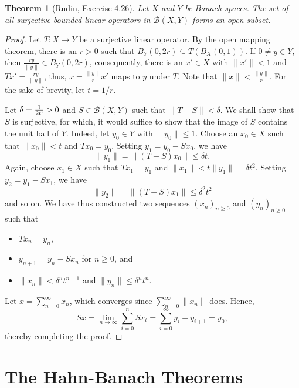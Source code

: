 \documentclass[12pt]{article}
\theoremstyle{thmstyle}
\newtheorem{theorem}{Theorem}[section]
\theoremstyle{defstyle}
\newcommand{\scrB}{\mathscr B}
\renewcommand{\le}{\leqslant}
\renewcommand{\ge}{\geqslant}
\begin{document}
\begin{theorem}[Rudin, Exercise 4.26]
    Let $X$ and $Y$ be Banach spaces. The set of all surjective bounded linear operators in $\scrB(X, Y)$ forms an open subset.
\end{theorem}
\begin{proof}
    Let $T: X\to Y$ be a surjective linear operator. By the open mapping theorem, there is an $r > 0$ such that $B_Y(0, 2r)\subseteq T\left(B_X(0, 1)\right)$. If $0\ne y\in Y$, then $\frac{ry}{\|y\|}\in B_Y(0, 2r)$, consequently, there is an $x'\in X$ with $\|x'\| < 1$ and $Tx' = \frac{ry}{\|y\|}$, thus, $x = \frac{\|y\|}{r}x'$ maps to $y$ under $T$. Note that $\|x\| < \frac{\|y\|}{r}$. For the sake of brevity, let $t = 1/r$.

    Let $\delta = \frac{1}{2t`} > 0$ and $S\in\scrB(X, Y)$ such that $\|T - S\| < \delta$. We shall show that $S$ is surjective, for which, it would suffice to show that the image of $S$ contains the unit ball of $Y$. Indeed, let $y_0\in Y$ with $\|y_0\|\le 1$. Choose an $x_0\in X$ such that $\|x_0\| < t$ and $Tx_0 = y_0$. Setting $y_1 = y_0 - Sx_0$, we have 
    \begin{equation*}
        \|y_1\| = \|(T - S)x_0\|\le\delta t.
    \end{equation*}
    Again, choose $x_1\in X$ such that $Tx_1 = y_1$ and $\|x_1\| < t\|y_1\| = \delta t^2$. Setting $y_2 = y_1 - Sx_1$, we have 
    \begin{equation*}
        \|y_2\| = \|(T - S)x_1\|\le \delta^2t^2
    \end{equation*}
    and so on. We have thus constructed two sequences $(x_n)_{n\ge 0}$ and $(y_n)_{n\ge 0}$ such that 
    \begin{itemize}
        \item $Tx_n = y_n$, 
        \item $y_{n + 1} = y_n - Sx_n$ for $n\ge 0$, and
        \item $\|x_n\| < \delta^n t^{n + 1}$ and $\|y_n\|\le\delta^n t^{n}$.
    \end{itemize}
    Let $x = \displaystyle\sum_{n = 0}^\infty x_n$, which converges since $\displaystyle\sum_{n = 0}^\infty \|x_n\|$ does. Hence, 
    \begin{equation*}
        Sx = \lim_{n\to\infty}\sum_{i = 0}^n Sx_i = \sum_{i = 0}^\infty y_i - y_{i + 1} = y_0,
    \end{equation*}
    thereby completing the proof.
\end{proof}

\section{The Hahn-Banach Theorems}
\end{document}
